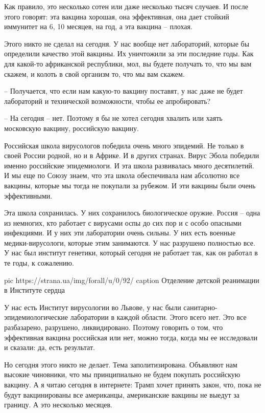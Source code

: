 Как правило, это несколько сотен или даже несколько тысяч случаев. И после
этого говорят: эта вакцина хорошая, она эффективная, она дает стойкий иммунитет
на 6, 10 месяцев, на год, а эта вакцина – плохая.

Этого никто не сделал на сегодня. У нас вообще нет лабораторий, которые бы
определили качество этой вакцины. Их уничтожили за эти последние годы. Как для
какой-то африканской республики, мол, вы будете получать то, что мы вам скажем,
и колоть в свой организм то, что мы вам скажем. 

– Получается, что если нам какую-то вакцину поставят, у нас даже не будет
лабораторий и технической возможности, чтобы ее апробировать? 

– На сегодня – нет. Поэтому я бы не хотел сегодня хвалить или хаять московскую
вакцину, российскую вакцину. 

Российская школа вирусологов победила очень много эпидемий. Не только в своей
России родной, но и в Африке. И в других странах. Вирус Эбола победили именно
российские эпидемиологи. И эта школа развивалась много десятилетий. И мы еще по
Союзу знаем, что эта школа обеспечивала нам абсолютно все вакцины, которые мы
тогда не покупали за рубежом. И эти вакцины были очень эффективными.

Эта школа сохранилась. У них сохранилось биологическое оружие. Россия – одна из
немногих, кто работает с вирусами оспы до сих пор и с особо опасными
инфекциями. И у них эти лаборатории очень сильны. У них есть военные
медики-вирусологи, которые этим занимаются. У нас разрушено полностью все. У
нас был институт генетики, который сегодня не работает так, как он работал в те
годы, к сожалению. 

\ifcmt
  pic https://strana.ua/img/forall/u/0/92/%
  caption Отделение детской реанимации в Институте сердца 
\fi

У нас есть Институт вирусологии во Львове, у нас были
санитарно-эпидемиологические лаборатории в каждой области. Этого всего нет. Это
все разбазарено, разрушено, ликвидировано. Поэтому говорить о том, что
эффективная вакцина российская или нет, можно тогда, когда мы ее исследовали и
сказали: да, есть результат. 

Но сегодня этого никто не делает. Тема заполитизирована. Объявляют нам высокие
чиновники, что мы принципиально не будем покупать российскую вакцину. А я читаю
сегодня в интернете: Трамп хочет принять закон, что, пока не будут
вакцинированы все американцы, американские вакцины не выедут за границу. А это
несколько месяцев. 

